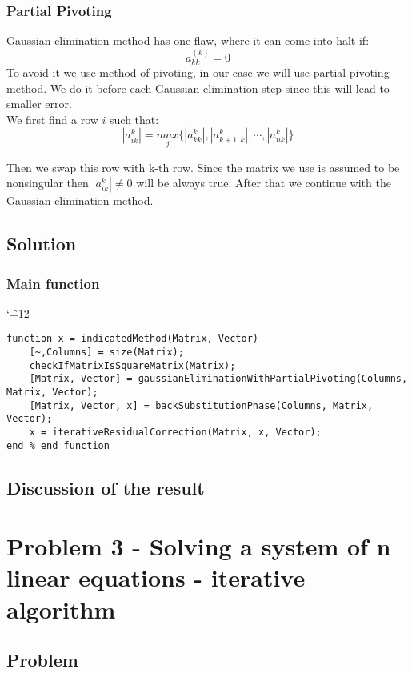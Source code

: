 \documentclass{report}
\newenvironment{simplechar}{%
   \catcode`\^=12
}{}
\begin{document}
\subsection{Partial Pivoting}
Gaussian elimination method has one flaw, where it can come into halt if:
\[ a_{kk}^{(k)} = 0 \]
To avoid it we use method of pivoting, in our case we will use partial pivoting method.
We do it before each Gaussian elimination step since this will lead to smaller error.
\\We first find a row $i$ such that:
\[ |{a_{ik}^{k}}| = \underset{j}{max} \{ |{a_{kk}^{k}}|, |{a_{k+1, k}^{k}}|, \cdots, |{a_{nk}^{k}}|\} \]

Then we swap this row with k-th row. Since the matrix we use is assumed to be nonsingular then $|{a_{ik}^{k}}| \neq 0$ will be always true. After that we continue with the Gaussian elimination method.

\section{Solution}

\subsection{Main function}
\begin{simplechar}
\begin{lstlisting}
function x = indicatedMethod(Matrix, Vector)
    [~,Columns] = size(Matrix);
    checkIfMatrixIsSquareMatrix(Matrix);
    [Matrix, Vector] = gaussianEliminationWithPartialPivoting(Columns, Matrix, Vector);
    [Matrix, Vector, x] = backSubstitutionPhase(Columns, Matrix, Vector);
    x = iterativeResidualCorrection(Matrix, x, Vector);
end % end function
\end{lstlisting}
\end{simplechar}



\section{Discussion of the result}

\chapter{Problem 3 - Solving a system of n linear equations - iterative algorithm}

\section{Problem}
\end{document}
